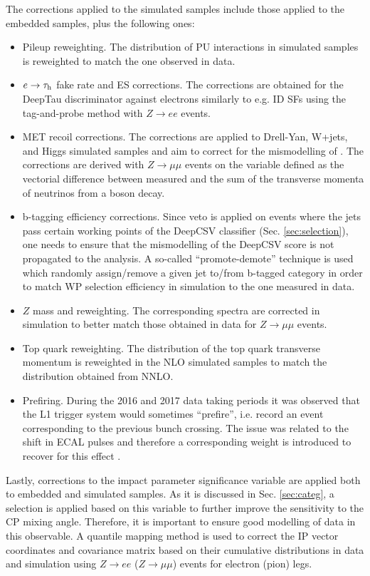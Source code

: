 The corrections applied to the simulated samples include those applied to the embedded samples, plus the following ones:
\begin{itemize}
    \item Pileup reweighting. The distribution of PU interactions in simulated samples is reweighted to match the one observed in data.
    \item $e\to\tau_\mathrm{h}$ fake rate and ES corrections. The corrections are obtained for the DeepTau discriminator against electrons similarly to e.g. \tauh ID SFs using the tag-and-probe method with $Z\to ee$ events. 
    \item MET recoil corrections. The corrections are applied to Drell-Yan, W+jets, and Higgs simulated samples and aim to correct for the mismodelling of \met. The corrections are derived with $Z\to\mu\mu$ events on the variable defined as the vectorial difference between measured \met and the sum of the transverse momenta of neutrinos from a boson decay. 
    \item b-tagging efficiency corrections. Since veto is applied on events where the jets pass certain working points of the DeepCSV classifier (Sec. \ref{sec:selection}), one needs to ensure that the mismodelling of the DeepCSV score is not propagated to the analysis. A so-called \enquote{promote-demote} technique is used which randomly assign/remove a given jet to/from b-tagged category in order to match WP selection efficiency in simulation to the one measured in data.
    \item $Z$ mass and \pt reweighting. The corresponding spectra are corrected in simulation to better match those obtained in data for $Z\to \mu\mu$ events. 
    \item Top quark \pt reweighting. The distribution of the top quark transverse momentum is reweighted in the NLO simulated samples to match the distribution obtained from NNLO.
    \item Prefiring. During the 2016 and 2017 data taking periods it was observed that the L1 trigger system would sometimes \enquote{prefire}, i.e. record an event corresponding to the previous bunch crossing. The issue was related to the shift in ECAL pulses and therefore a corresponding weight is introduced to recover for this effect \cite{CMS:2020cmk}. 
\end{itemize}

Lastly, corrections to the impact parameter significance variable are applied both to embedded and simulated samples. As it is discussed in Sec. \ref{sec:categ}, a selection is applied based on this variable to further improve the sensitivity to the CP mixing angle. Therefore, it is important to ensure good modelling of data in this observable. A quantile mapping method is used to correct the IP vector coordinates and covariance matrix based on their cumulative distributions in data and simulation using $Z\to ee$ ($Z\to \mu\mu$) events for electron (pion) legs.  

